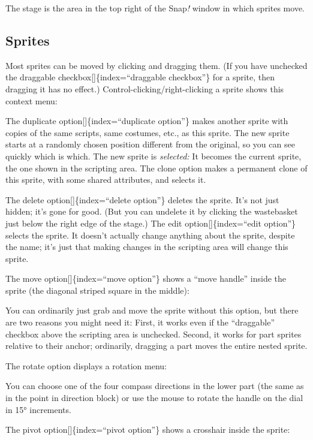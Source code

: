 \documentclass[
  letterpaper,
]{book}
\begin{document}
The stage is the area in the top right of the Snap\emph{!} window in
which sprites move.

\subsection{Sprites}\label{sprites}

Most sprites can be moved by clicking and dragging them. (If you have
unchecked the draggable checkbox{[}{]}\{index=``draggable checkbox''\}
for a sprite, then dragging it has no effect.)
Control-clicking/right-clicking a sprite shows this context menu:

The duplicate option{[}{]}\{index=``duplicate option''\} makes another
sprite with copies of the same scripts, same costumes, etc., as this
sprite. The new sprite starts at a randomly chosen position different
from the original, so you can see quickly which is which. The new sprite
is \emph{selected:} It becomes the current sprite, the one shown in the
scripting area. The clone option makes a permanent clone of this sprite,
with some shared attributes, and selects it.

The delete option{[}{]}\{index=``delete option''\} deletes the sprite.
It's not just hidden; it's gone for good. (But you can undelete it by
clicking the wastebasket just below the right edge of the stage.) The
edit option{[}{]}\{index=``edit option''\} selects the sprite. It
doesn't actually change anything about the sprite, despite the name;
it's just that making changes in the scripting area will change this
sprite.

The move option{[}{]}\{index=``move option''\} shows a ``move handle''
inside the sprite (the diagonal striped square in the middle):

You can ordinarily just grab and move the sprite without this option,
but there are two reasons you might need it: First, it works even if the
``draggable'' checkbox above the scripting area is unchecked. Second, it
works for part sprites relative to their anchor; ordinarily, dragging a
part moves the entire nested sprite.

The rotate option displays a rotation menu:

You can choose one of the four compass directions in the lower part (the
same as in the point in direction block) or use the mouse to rotate the
handle on the dial in 15° increments.

The pivot option{[}{]}\{index=``pivot option''\} shows a crosshair
inside the sprite:
\end{document}
